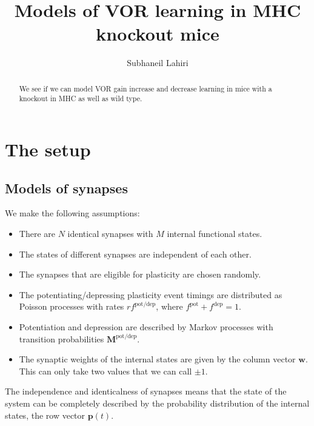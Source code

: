 \documentclass[12pt]{article}
\title{Models of VOR learning in MHC knockout mice}
\author{Subhaneil Lahiri
%
}
\newcommand{\pr}{\mathbf{p}}
\newcommand{\w}{\mathbf{w}}
\newcommand{\M}{\mathbf{M}}
\newcommand{\pot}{^{\text{pot}}}
\newcommand{\dep}{^{\text{dep}}}
\newcommand{\potdep}{^{\text{pot/dep}}}
\begin{document}
\maketitle




\begin{abstract}
  We see if we can model VOR gain increase and decrease learning in mice with a knockout in MHC as well as wild type.
\end{abstract}

\tableofcontents


\section{The setup}\label{sec:setup}


\subsection{Models of synapses}\label{sec:synapse}

We make the following assumptions:
\begin{itemize}
  \item There are $N$ identical synapses with $M$ internal functional states.
  \item The states of different synapses are independent of each other.
  \item The synapses that are eligible for plasticity are chosen randomly.
  \item The potentiating/depressing plasticity event timings are distributed as Poisson processes with rates $rf\potdep$, where $f\pot+f\dep=1$.
  \item Potentiation and depression are described by Markov processes with transition probabilities $\M\potdep$.
  \item The synaptic weights of the internal states are given by the column vector $\w$. This can only take two values that we can call $\pm1$.
\end{itemize}

The independence and identicalness of synapses means that the state of the system can be completely described by the probability distribution of the internal states, the row vector $\pr(t)$.
\end{document}
